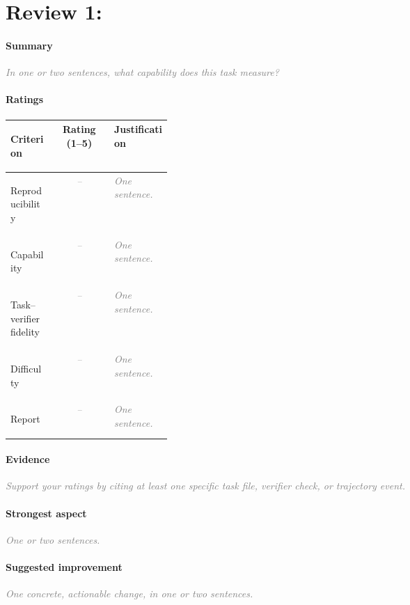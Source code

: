 \documentclass[11pt]{article}
\newcommand{\prompt}[1]{\textcolor{gray}{\textit{#1}}}
\begin{document}
\section*{Review 1: }

\paragraph{Summary}
\prompt{In one or two sentences, what capability does this task measure?}

\paragraph{Ratings}
\begin{center}
\renewcommand{\arraystretch}{1.3}
\begin{tabularx}{\linewidth}{>{\bfseries\raggedright\arraybackslash}p{0.27\linewidth}cX}
  \toprule
  Criterion & Rating (1--5) & Justification \\
  \midrule
  Reproducibility & \prompt{--} & \prompt{One sentence.} \\
  Capability & \prompt{--} & \prompt{One sentence.} \\
  Task--verifier fidelity & \prompt{--} & \prompt{One sentence.} \\
  Difficulty & \prompt{--} & \prompt{One sentence.} \\
  Report & \prompt{--} & \prompt{One sentence.} \\
  \bottomrule
\end{tabularx}
\end{center}

\paragraph{Evidence}
\prompt{Support your ratings by citing at least one specific task file, verifier check, or trajectory event.}

\paragraph{Strongest aspect}
\prompt{One or two sentences.}

\paragraph{Suggested improvement}
\prompt{One concrete, actionable change, in one or two sentences.}
\end{document}
